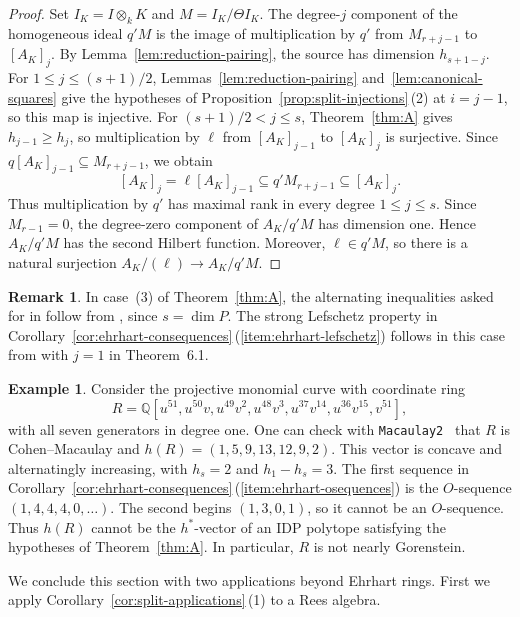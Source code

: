 \documentclass[a4paper,11pt]{amsart}
\newcommand{\kk}{k}
\newcommand{\QQ}{\mathbb{Q}}
\theoremstyle{definition}
\newtheorem{example}[theorem]{Example}
\newtheorem{remark}[theorem]{Remark}
\begin{document}
\begin{proof}
Set $I_K=I\otimes_{\kk}K$ and $M=I_K/\Theta I_K$. The degree-$j$ component of the homogeneous ideal $q'M$ is the image of multiplication by $q'$ from $M_{r+j-1}$ to $[A_K]_j$. By Lemma~\ref{lem:reduction-pairing}, the source has dimension $h_{s+1-j}$. For $1\le j\le (s+1)/2$, Lemmas~\ref{lem:reduction-pairing} and~\ref{lem:canonical-squares} give the hypotheses of Proposition~\ref{prop:split-injections}\,\textup{(2)} at $i=j-1$, so this map is injective. For $(s+1)/2<j\le s$, Theorem~\ref{thm:A} gives $h_{j-1}\ge h_j$, so multiplication by $\ell$ from $[A_K]_{j-1}$ to $[A_K]_j$ is surjective. Since $q[A_K]_{j-1}\subseteq M_{r+j-1}$, we obtain
\[
 [A_K]_j=\ell[A_K]_{j-1}\subseteq q'M_{r+j-1}\subseteq[A_K]_j.
\]
Thus multiplication by $q'$ has maximal rank in every degree $1\le j\le s$. Since $M_{r-1}=0$, the degree-zero component of $A_K/q'M$ has dimension one. Hence $A_K/q'M$ has the second Hilbert function. Moreover, $\ell\in q'M$, so there is a natural surjection $A_K/(\ell)\to A_K/q'M$.
\end{proof}

\begin{remark}\label{rem:app-scope}
In case~\textup{(3)} of Theorem~\ref{thm:A}, the alternating inequalities asked for in \cite[Question~2.21]{SVL13} follow from \cite[Corollary~2.2 and Theorem~2.4]{APP25}, since $s=\dim P$. The strong Lefschetz property in Corollary~\ref{cor:ehrhart-consequences}\,\textup{(\ref{item:ehrhart-lefschetz})} follows in this case from \cite[Theorems~2.1 and~6.1]{APP25} with $j=1$ in Theorem~6.1.
\end{remark}

\begin{example}\label{ex:second-difference}
Consider the projective monomial curve with coordinate ring
\[
R=\QQ[u^{51},u^{50}v,u^{49}v^2,u^{48}v^3,u^{37}v^{14},u^{36}v^{15},v^{51}],
\]
with all seven generators in degree one. One can check with \texttt{Macaulay2}~\cite{M2} that $R$ is Cohen--Macaulay and $h(R)=(1,5,9,13,12,9,2)$. This vector is concave and alternatingly increasing, with $h_s=2$ and $h_1-h_s=3$. The first sequence in Corollary~\ref{cor:ehrhart-consequences}\,\textup{(\ref{item:ehrhart-osequences})} is the $O$-sequence $(1,4,4,4,0,\ldots)$. The second begins $(1,3,0,1)$, so it cannot be an $O$-sequence. Thus $h(R)$ cannot be the $h^*$-vector of an IDP polytope satisfying the hypotheses of Theorem~\ref{thm:A}. In particular, $R$ is not nearly Gorenstein.
\end{example}

We conclude this section with two applications beyond Ehrhart rings. First we apply Corollary~\ref{cor:split-applications}\,\textup{(1)} to a Rees algebra.
\end{document}
